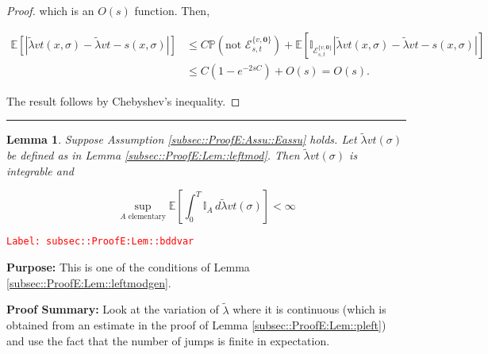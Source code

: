 \documentclass[12pt]{article}
\newcommand{\mb}{\mathbb}
\newcommand{\mc}{\mathcal}
\newcommand{\te}{\text}
\newcommand{\tr}{\textcolor{red}}
\newcommand{\labe}[1]{\tr{\texttt{Label: #1}}}
\newcommand{\purpose}{\textbf{Purpose: }}
\newcommand{\pfsum}{\textbf{Proof Summary: }}
\newcommand{\lin}{\rule{\linewidth}{0.4 pt}}
\newcommand{\pr}{\mb{P}}							%
\newcommand{\ex}[1]{\mb{E}\left[#1\right]}			%
\renewcommand{\root}{\mathbf{0}}				%
\renewcommand{\v}{v}							%
\renewcommand{\S}{S}							%
\newcommand{\s}{\sigma}							%
\newcommand{\T}{T}								%
\newcommand{\x}{x}								%
\renewcommand{\t}{t}							%
\renewcommand{\tt}{s}							%
\newcommand{\const}{C}							%
\newcommand{\alt}[1]{\widetilde{#1}}			%
\newcommand{\evnt}{\mc{E}}						%
\newcommand{\typset}{A}							%
\newcommand{\crate}{\alt{\lambda}}				%
\newtheorem{lem}[thms]{Lemma}
\begin{document}
\begin{proof}
which is an \(O(\tt)\) function. Then,

\begin{align*}
\ex{|\crate{\v}{\t}(\x{}{},\s) - \crate{\v}{\t-\tt}(\x{}{},\s)|} &\leq \const{}\pr\left(\te{not }\evnt{}^{\{\v,\root\}}_{\tt,\t}\right) + \ex{\mb{I}_{\evnt{}^{\{\v,\root\}}_{\tt,\t}}|\crate{\v}{\t}(\x{}{},\s) - \crate{\v}{\t-\tt}(\x{}{},\s)|}\\
&\leq \const{}(1 - e^{-2\tt\const{}}) + O(\tt) = O(\tt).
\end{align*}

The result follows by Chebyshev's inequality.
\end{proof}

\lin

\begin{lem}
Suppose Assumption \ref{subsec::ProofE:Assu::Eassu} holds. Let \(\crate{\v}{\t}(\s)\) be defined as in Lemma \ref{subsec::ProofE:Lem::leftmod}. Then \(\crate{\v}{\t}(\s)\) is integrable and 

\[\sup_{\typset\te{ elementary}} \ex{\int_0^\T \mb{I}_\typset\,d\crate{\v}{\t}(\s)} < \infty\]
\label{subsec::ProofE:Lem::bddvar}
\end{lem}
\labe{subsec::ProofE:Lem::bddvar}

\purpose This is one of the conditions of Lemma \ref{subsec::ProofE:Lem::leftmodgen}.

\pfsum Look at the variation of \(\crate\) where it is continuous (which is obtained from an estimate in the proof of Lemma \ref{subsec::ProofE:Lem::pleft}) and use the fact that the number of jumps is finite in expectation.
\end{document}
